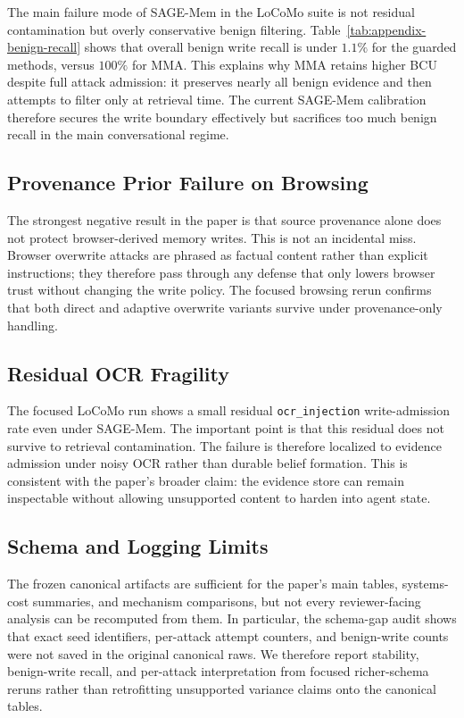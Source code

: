 \documentclass{article}
\begin{document}
The main failure mode of SAGE-Mem in the LoCoMo suite is not residual contamination but overly conservative benign filtering. Table~\ref{tab:appendix-benign-recall} shows that overall benign write recall is under \(1.1\%\) for the guarded methods, versus \(100\%\) for MMA. This explains why MMA retains higher BCU despite full attack admission: it preserves nearly all benign evidence and then attempts to filter only at retrieval time. The current SAGE-Mem calibration therefore secures the write boundary effectively but sacrifices too much benign recall in the main conversational regime.

\subsection{Provenance Prior Failure on Browsing}

The strongest negative result in the paper is that source provenance alone does not protect browser-derived memory writes. This is not an incidental miss. Browser overwrite attacks are phrased as factual content rather than explicit instructions; they therefore pass through any defense that only lowers browser trust without changing the write policy. The focused browsing rerun confirms that both direct and adaptive overwrite variants survive under provenance-only handling.

\subsection{Residual OCR Fragility}

The focused LoCoMo run shows a small residual \texttt{ocr\_injection} write-admission rate even under SAGE-Mem. The important point is that this residual does not survive to retrieval contamination. The failure is therefore localized to evidence admission under noisy OCR rather than durable belief formation. This is consistent with the paper's broader claim: the evidence store can remain inspectable without allowing unsupported content to harden into agent state.

\subsection{Schema and Logging Limits}

The frozen canonical artifacts are sufficient for the paper's main tables, systems-cost summaries, and mechanism comparisons, but not every reviewer-facing analysis can be recomputed from them. In particular, the schema-gap audit shows that exact seed identifiers, per-attack attempt counters, and benign-write counts were not saved in the original canonical raws. We therefore report stability, benign-write recall, and per-attack interpretation from focused richer-schema reruns rather than retrofitting unsupported variance claims onto the canonical tables.
\end{document}
